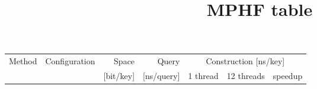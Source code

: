 \documentclass{article}
\title{MPHF table}
\date{}
\begin{document}
\addtolength\tabcolsep{-0.5pt}
\newcommand{\mr}[1]{\multirow{2}{*}{#1}}
\begin{centering}
\begin{tabular}[t]{ll rrrrr}
    \toprule
    Method & Configuration & Space      & Query      & \multicolumn{3}{c}{Construction [ns/key]} \\
    \cline{5-7}
             &               & [bit/key] & [ns/query] & 1 thread & 12 threads & speedup \\ \midrule

\end{tabular}
\end{centering}
\end{document}
